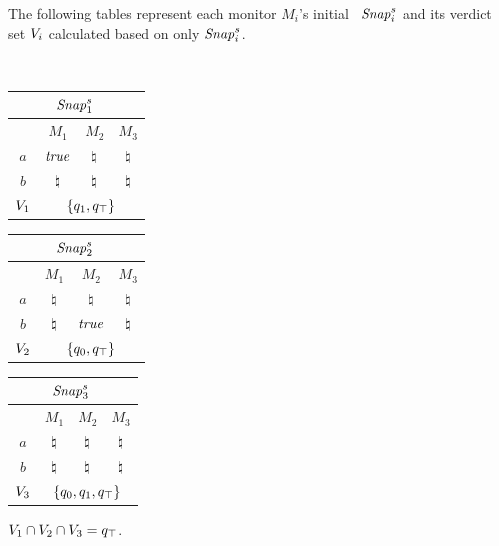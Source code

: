 \begin{frame}

\begin{example}
The following tables represent each monitor $M_i$'s initial \localreg~$\mathit{Snap}_i^s$ and its verdict set $V_i$ calculated based on only $\mathit{Snap}_i^s$.

\ \\


\begin{center}

 \begin{tabular}{|c|c|c|c|}
   \multicolumn{1}{r}{} &  \multicolumn{2}{c}{ {$\mathit{Snap}_1^s$}}\\
\hline
  & $M_1$ & $M_2$ & $M_3$\\
 \hline
   $a$ & $\mathit{true}$ & $\natural$ & $\natural$\\
   $b$ & $\natural$ & $\natural$ & $\natural$\\
\hline
  $V_1$  &  \multicolumn{3}{c|}{\cellcolor{gray!25}$\{q_1, q_\top\}$}\\
\hline
  \end{tabular}  
\quad
 \begin{tabular}{|c|c|c|c|}
   \multicolumn{1}{r}{} &  \multicolumn{2}{c}{ {$\mathit{Snap}_2^s$}}\\
\hline
  & $M_1$ & $M_2$ & $M_3$\\
 \hline
   $a$ & $\natural$ & $\natural$ & $\natural$\\
   $b$ & $\natural$ & $\mathit{true}$ & $\natural$\\
\hline
  $V_2$  &  \multicolumn{3}{c|}{\cellcolor{gray!25}$\{q_0, q_\top\}$}\\
\hline
  \end{tabular} 

\end{center}


\begin{center}
 \begin{tabular}{|c|c|c|c|}
   \multicolumn{1}{r}{} &  \multicolumn{2}{c}{ {$\mathit{Snap}_3^s$}}\\
\hline
  & $M_1$ & $M_2$ & $M_3$\\
 \hline
   $a$ & $\natural$ & $\natural$ & $\natural$\\
   $b$ & $\natural$ & $\natural$ & $\natural$\\
\hline
  $V_3$  &  \multicolumn{3}{c|}{\cellcolor{gray!25}$\{q_0, q_1, q_\top\}$}\\
\hline
  \end{tabular}   
\end{center}


$V_1 \cap V_2 \cap V_3 = q_\top$.

\end{example}

\end{frame}








